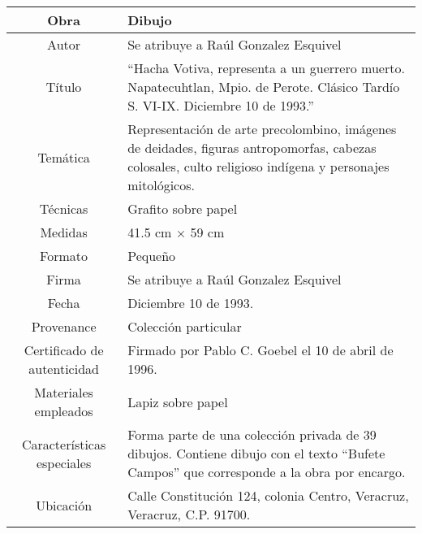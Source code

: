 \begin{table}[H]
\centering
\begin{tabular}{|c|m{}|}
\hline
Obra& Dibujo	\\
\hline
Autor & Se atribuye a Ra\'ul Gonzalez Esquivel\\
\hline
T\'itulo & ``Hacha Votiva, representa a un guerrero muerto. Napatecuhtlan, Mpio. de Perote. Cl\'asico Tard\'io S. VI-IX. Diciembre 10 de 1993.'' \\
\hline
Tem\'atica & Representaci\'on de arte precolombino, im\'agenes de deidades, figuras antropomorfas, cabezas colosales, culto religioso ind\'igena y personajes mitol\'ogicos.\\
\hline
T\'ecnicas &Grafito sobre papel \\
\hline
Medidas & 41.5 cm $\times$ 59 cm \\
\hline
 Formato & Peque\~no \\
 \hline
 Firma & Se atribuye a Ra\'ul Gonzalez Esquivel\\ 
 \hline
  Fecha & Diciembre 10 de 1993.\\
 \hline
 Provenance & Colecci\'on particular\\
 \hline
 Certificado de autenticidad& Firmado por Pablo C. Goebel el 10 de abril de 1996.  \\
 \hline 
  Materiales empleados & Lapiz sobre papel\\
 \hline
 Caracter\'isticas especiales & Forma parte de una colecci\'on privada de 39 dibujos. 
Contiene dibujo con el texto ``Bufete Campos'' que corresponde a la obra por encargo. \\
\hline 
Ubicaci\'on & Calle Constituci\'on 124, colonia Centro, Veracruz, Veracruz, C.P. 91700.\\
\hline

\end{tabular}
\end{table}

